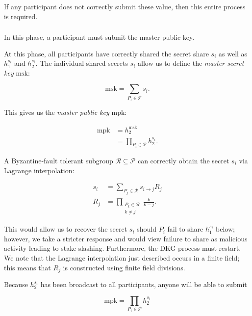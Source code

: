 If any participant does not correctly submit these value,
then this entire process is required.



\subsubsection{\MasterPublicKey{}}

In this phase, a participant must submit the master public key.

At this phase, all participants have correctly shared
the secret share $s_{i}$ as well as $h_{1}^{s_{i}}$ and $h_{2}^{s_{i}}$.
The individual shared secrets $s_{i}$ allow us to define the
\emph{master secret key} $\text{msk}$:

\begin{equation}
    \text{msk} = \sum_{P_{i}\in\mathcal{P}} s_{i}.
\end{equation}

\noindent
This gives us the \emph{master public key} $\text{mpk}$:

\begin{align}
    \text{mpk} &= h_{2}^{\text{msk}} \nonumber\\
        &= \prod_{P_{i}\in\mathcal{P}} h_{2}^{s_{i}}.
\end{align}

\noindent
A Byzantine-fault tolerant subgroup $\mathcal{R}\subseteq\mathcal{P}$ can
correctly obtain the secret $s_{i}$ via Lagrange interpolation:

\begin{align}
    s_{i} &= \sum_{P_{j}\in\mathcal{R}} s_{i\to j} R_{j} \nonumber\\
    R_{j} &= \prod_{\substack{P_{k}\in\mathcal{R} \\ k\ne j}} \frac{k}{k-j}.
    \label{eq:Rj_coefs}
\end{align}

\noindent
This would allow us to recover the secret $s_{i}$ should $P_{i}$
fail to share $h_{1}^{s_{i}}$ below; however,
we take a stricter response and would view failure to share
as malicious activity leading to stake slashing.
Furthermore, the DKG process must restart.
We note that the Lagrange interpolation just described
occurs in a finite field;
this means that $R_{j}$ is constructed using finite field divisions.

Because $h_{2}^{s_{i}}$ has been broadcast to all participants,
anyone will be able to submit

\begin{equation}
    \text{mpk} = \prod_{P_{i}\in\mathcal{P}} h_{2}^{s_{i}}
\end{equation}

